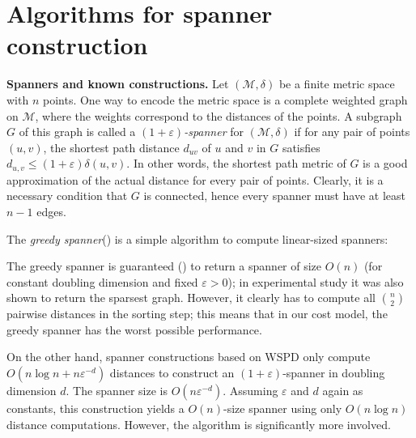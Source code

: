 \documentclass[a4paper,UKenglish,cleveref, autoref]{lipics-v2019}
\newcommand{\eps}{\varepsilon}
\newcommand{\metricspace}{\mathcal{M}}
\newcommand{\dist}{\delta}
\newcommand{\myparagraph}[1]{\textbf{#1.}}
\begin{document}
\section{Algorithms for spanner construction}

\myparagraph{Spanners and known constructions}
%
Let $(\metricspace, \dist)$ be a finite metric space with $n$ points. 
One way to encode the metric space is a complete weighted graph on $\metricspace$,
where the weights correspond to the distances of the points.
A subgraph $G$ of this graph is called a \emph{$(1+\eps)$-spanner} for $(\metricspace,\dist)$ 
if for any pair of points $(u,v)$,
the shortest path distance $d_{uv}$ of $u$ and $v$ in $G$ satisfies $d_{u,v}\leq (1+\eps)\dist(u,v)$.
In other words, the shortest path metric of $G$ is a good approximation of the actual distance for every pair of points.
Clearly, it is a necessary condition that $G$ is connected, hence every spanner must have at least $n-1$ edges.

The \emph{greedy spanner}(\cite{althofer1993sparse}) is a simple algorithm to compute linear-sized spanners:
\begin{algorithmic}
\label{alg:greedy_spanner}
\Function{GreedySpanner}{$P, \eps$}
    \If{$d_{ij}>(1+\eps)\dist(p_i,p_j)$}
    \EndIf
    \EndFor
\EndFunction
\end{algorithmic}

The greedy spanner is guaranteed (\cite{althofer1993sparse}) to return a spanner of size $O(n)$
(for constant doubling dimension and fixed $\eps>0$); in experimental study \cite{farshi2009experimental}
it was also shown to return the sparsest graph. However, it clearly
has to compute all $\binom{n}{2}$ pairwise distances in the sorting step;
this means that in our cost model, the greedy spanner has the worst possible
performance.

On the other hand, spanner constructions based on WSPD only compute
$O(n\log n+n \eps^{-d})$ distances 
to construct an $(1+\eps)$-spanner in doubling dimension $d$.
The spanner size is $O(n\eps^{-d})$. Assuming $\eps$ and $d$ again as constants,
this construction yields a $O(n)$-size spanner using only $O(n\log n)$ distance
computations. However, the algorithm is significantly more involved.
\end{document}
